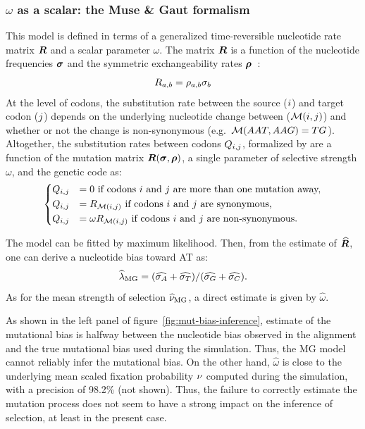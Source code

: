 \documentclass{article}
\begin{document}
\subsubsection{\texorpdfstring{$\omega$}{ω} as a scalar: the Muse \& Gaut formalism}
This model is defined in terms of a generalized time-reversible nucleotide rate matrix $\bm{R}$ and a scalar parameter $\omega$.
The matrix $\bm{R}$ is a function of the nucleotide frequencies $\bm{\sigma}$ and the symmetric exchangeability rates $\bm{\rho}$~\citep{Tavare1986}:
\begin{equation}
    R_{a, b} = \rho_{a,b}\sigma_b
\end{equation}
At the level of codons, the {substitution} rate between the source (${i}$) and target codon (${j}$) depends on the underlying nucleotide change between ($\mathcal{M}({i}, {j})$) and whether or not the change is {non-synonymous} (e.g.~$\mathcal{M}(AAT, AAG) = TG$).
Altogether, the {substitution} rates between codons $Q_{{i}, {j}}$, formalized by \citet{Muse1994} are a function of the mutation matrix $\bm{R}(\bm{\sigma}, \bm{\rho})$, a single parameter of selective strength $\omega$, and the genetic code as:
\begin{equation}
    \begin{dcases}
        Q_{{i}, {j}} & = 0 \text{ if codons ${i}$ and ${j}$ are more than one mutation away,} \\
        Q_{{i}, {j}} & = R_{\mathcal{M}({i}, {j})} \text{ if codons ${i}$ and ${j}$ are {synonymous},} \\
        Q_{{i}, {j}} & = \omega R_{\mathcal{M}({i}, {j})} \text{ if codons ${i}$ and ${j}$ are non-synonymous}.
    \end{dcases}
    \label{eq:codon-muse-gaut}
\end{equation}

The model can be fitted by maximum {likelihood}.
Then, from the estimate of $\widehat{\bm{R}}$, one can derive a nucleotide bias toward AT as:
\begin{equation}
    \widehat{\lambda}_{\text{{MG}}} = (\widehat{\sigma_A} +\widehat{\sigma_T}) /(\widehat{\sigma_G} +\widehat{\sigma_C}).\label{eq:lambda-R}
\end{equation}
As for the mean strength of selection $\widehat{\nu}_{\text{{MG}}}$, a direct estimate is given by $\widehat{\omega}$.

As shown in the left panel of figure~\ref{fig:mut-bias-inference}, estimate of the mutational bias is halfway between the nucleotide bias observed in the alignment and the true mutational bias used during the simulation.
Thus, the {MG} model cannot reliably infer the mutational bias.
On the other hand, $\widehat{\omega}$ is close to the underlying mean scaled fixation probability $\nu$ computed during the simulation, with a precision of 98.2\% (not shown).
Thus, the failure to correctly estimate the mutation process does not seem to have a strong impact on the inference of selection, at least in the present case.
\end{document}
